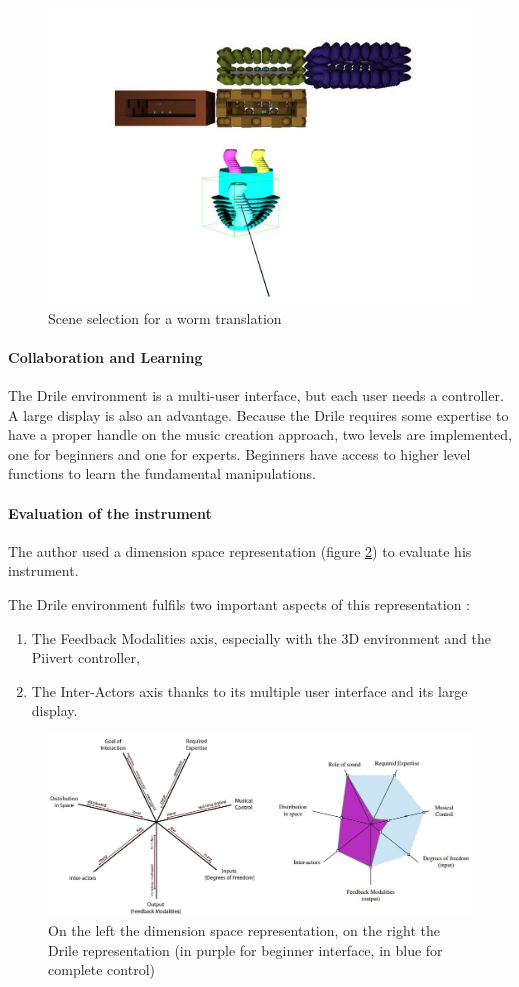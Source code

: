 \begin{figure}[h!]
\centering\includegraphics[scale=0.55]{image/scenes.JPG}
\caption{Scene selection for a worm translation}
\label{fig:scene}
\end{figure}

\paragraph{Collaboration and Learning}
The Drile environment is a multi-user interface, but each user needs a controller. A large display is also an advantage. Because the Drile requires some expertise to have a proper handle on the music creation approach, two levels are implemented, one for beginners and one for experts. Beginners have access to higher level functions to learn the fundamental manipulations.

\paragraph{Evaluation of the instrument}
The author used a dimension space representation (figure \ref{fig:classinstr}) to evaluate his instrument\cite{birnbaum2005towards}. 

The Drile environment fulfils two important aspects of this representation : 
\begin{enumerate}
\item The Feedback Modalities axis, especially with the 3D environment and the Piivert controller, 
\item The Inter-Actors axis thanks to its multiple user interface and its large display.
\end{enumerate}

\begin{figure}[h!]
\centering\includegraphics[scale=0.65]{image/classification_new_instr.jpg}
\caption{On the left the dimension space representation,
on the right the Drile representation (in purple for beginner interface, in blue for complete control)}
\label{fig:classinstr}
\end{figure} 


